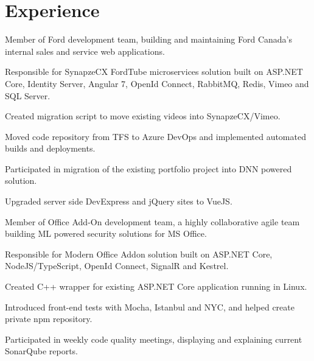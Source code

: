 \documentclass[letterpaper]{deedy-resume} %
\begin{document}
\begin{minipage}[t]{0.66\textwidth} %


\section{Experience}


\vspace{\topsep} %
\begin{tightitemize}
\item Member of Ford development team, building and maintaining Ford Canada's internal sales and service web applications.
\item Responsible for SynapzeCX FordTube microservices solution built on ASP.NET Core, Identity Server, Angular 7, OpenId Connect, RabbitMQ, Redis, Vimeo and SQL Server.
\item Created migration script to move existing videos into SynapzeCX/Vimeo.
\item Moved code repository from TFS to Azure DevOps and implemented automated builds and deployments.
\item Participated in migration of the existing portfolio project into DNN powered solution.
\item Upgraded server side DevExpress and jQuery sites to VueJS.
\end{tightitemize}

\sectionspace %



\vspace{\topsep} %
\begin{tightitemize}
\item Member of Office Add-On development team, a highly collaborative agile team building ML powered security solutions for MS Office.
\item Responsible for Modern Office Addon solution built on ASP.NET Core, NodeJS/TypeScript, OpenId Connect, SignalR and Kestrel.
\item Created C++ wrapper for existing ASP.NET Core application running in Linux.
\item Introduced front-end tests with Mocha, Istanbul and NYC, and helped create private npm repository.
\item Participated in weekly code quality meetings, displaying and explaining current SonarQube reports.
\end{tightitemize}


\end{minipage}
\end{document}
